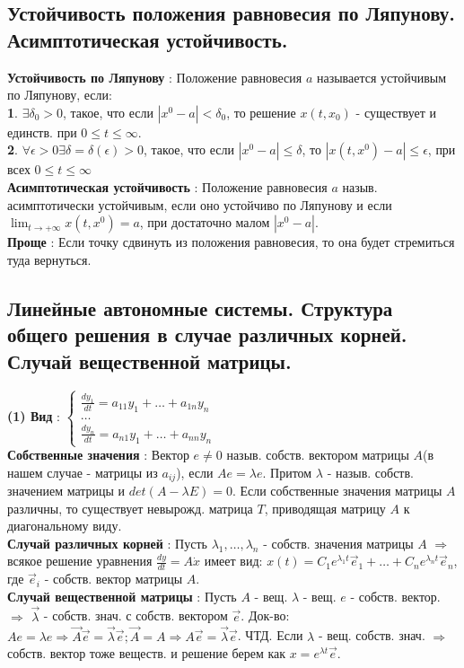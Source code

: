 \documentclass[unicode, 8pt, a4paper,oneside, landscape]{article}
\begin{document}
\begin{multicols}{4}
\subsection{Устойчивость положения равновесия по Ляпунову. Асимптотическая устойчивость.}

{\bf Устойчивость по Ляпунову} : Положение равновесия $a$ называется устойчивым по Ляпунову, если: \\
{\bf 1}. $\exists \delta_0 > 0$, такое, что если $|x^0 - a| < \delta_0$, то решение $x(t, x_0)$ - существует и единств. при $0\leq t \leq \infty$.\\
{\bf 2}. $\forall \epsilon > 0 \exists \delta = \delta(\epsilon) > 0$, такое, что если $|x^0 - a| \leq \delta$, то $|x(t, x^0) - a| \leq \epsilon$, при всех $0\leq t \leq \infty$\\
{\bf Асимптотическая устойчивость} : Положение равновесия $a$ назыв. асимптотически устойчивым, если оно устойчиво по Ляпунову и если $\lim_{t \to +\infty} x(t, x^0) = a$, при достаточно малом $|x^0 - a|$.\\
{\bf Проще} : Если точку сдвинуть из положения равновесия, то она будет стремиться туда вернуться.  

\subsection{Линейные автономные системы. Структура общего решения в случае различных корней. Случай вещественной матрицы.}
{\bf (1) Вид} : $\begin{cases} \frac{dy_1}{dt} = a_{11}y_1 + \ldots + a_{1n}y_n \\ \ldots \\ \frac{dy_n}{dt} = a_{n1}y_1 + \ldots + a_{nn}y_n \end{cases}$\\
{\bf Собственные значения} :  Вектор $e \neq 0$ назыв. собств. вектором матрицы $A$(в нашем случае - матрицы из $a_{ij}$), если $Ae = \lambda e$. Притом $\lambda$ - назыв. собств. значением матрицы и $det(A - \lambda E) = 0$. Если собственные значения матрицы $A$ различны, то существует невырожд. матрица $T$, приводящая матрицу $A$ к диагональному виду.\\ 
{\bf Случай различных корней} : Пусть $\lambda_1, \ldots, \lambda_n$ - собств. значения матрицы $A$ $\Rightarrow$ всякое решение уравнения $\frac{dy}{dt} = A\dot{x}$ имеет вид: $x(t) = C_1e^{\lambda_1 t}\vec{e}_1 + \ldots + C_ne^{\lambda_n t}\vec{e}_n$, где $\vec{e}_i$ - собств. вектор матрицы $A$.\\
{\bf  Случай вещественной матрицы} : Пусть $A$ - вещ. $\lambda$ - вещ. $e$ - собств. вектор. $\Rightarrow$ $\vec{\lambda}$ - собств. знач. с собств. вектором $\vec{e}$. Док-во: $Ae = \lambda e \Rightarrow \vec{A}\vec{e} = \vec{\lambda}\vec{e}; \vec{A} = A \Rightarrow A\vec{e} = \vec{\lambda}\vec{e}$. ЧТД. Если $\lambda$ - вещ. собств. знач. $\Rightarrow$ собств. вектор тоже веществ. и решение берем как $x = e^{\lambda t}\vec{e}$.


\end{multicols}
\end{document}
